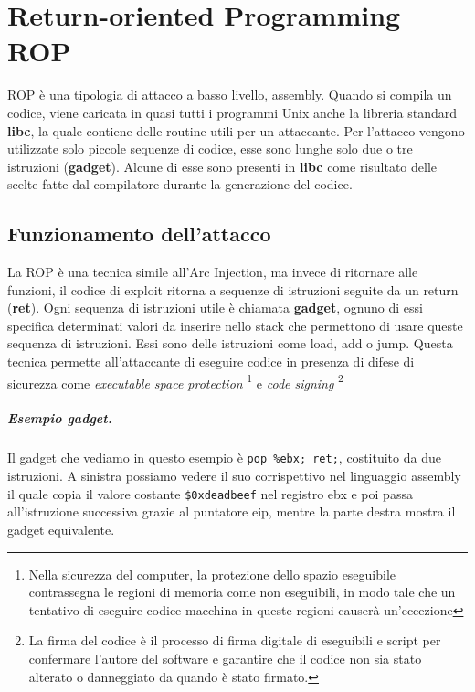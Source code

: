 \chapter{Return-oriented Programming ROP}

ROP è una tipologia di attacco a basso livello, assembly.
Quando si compila un codice, viene caricata in quasi tutti i programmi Unix anche la
libreria standard \textbf{libc}, la quale contiene delle routine utili per un attaccante.
Per l'attacco vengono utilizzate solo piccole sequenze di codice, esse sono lunghe
solo due o tre istruzioni (\textbf{gadget}). Alcune di esse sono presenti in \textbf{libc}
come risultato delle scelte fatte dal compilatore durante la generazione del codice.

\section{Funzionamento dell'attacco}

La ROP è una tecnica simile all'Arc Injection, ma invece di ritornare alle funzioni,
il codice di exploit ritorna a sequenze di istruzioni seguite da un return (\textbf{ret}).
Ogni sequenza di istruzioni utile è chiamata \textbf{gadget},
ognuno di essi specifica determinati valori da inserire nello stack che permettono
di usare queste sequenza di istruzioni.
Essi sono delle istruzioni come load, add o jump. Questa tecnica permette all'attaccante
di eseguire codice in presenza di difese di sicurezza
come \textit{executable space protection}
\footnote{ Nella sicurezza del computer, la protezione dello spazio eseguibile contrassegna
    le regioni di memoria come non eseguibili,
    in modo tale che un tentativo di eseguire codice macchina in queste regioni causerà un'eccezione}
e \textit{code signing}
\footnote{La firma del codice è il processo di firma digitale di eseguibili e script
    per confermare l'autore del software e garantire che
    il codice non sia stato alterato o danneggiato da quando è stato firmato.}

\paragraph{Esempio gadget.} Il gadget che vediamo in questo esempio
è \verb|pop %ebx; ret;|, costituito da due istruzioni. A sinistra possiamo vedere
il suo corrispettivo nel linguaggio assembly il quale copia il valore
costante \verb|$0xdeadbeef| nel registro ebx e poi passa all'istruzione successiva
grazie al puntatore eip, mentre la parte destra mostra il gadget equivalente.

